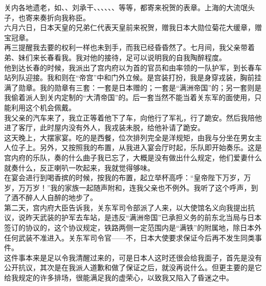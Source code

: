 关内各地遗老，如、、刘承干、、、、、、等等，都寄来祝贺的表章。上海的大流氓头子，也寄来奏折向我称臣。\\

六月六日，日本天皇的兄弟仁代表天皇前来祝贺，赠我日本大勋位菊花大缓章，赠宝冠章。\\

再三提醒我去要的权利一样也未到手，而我已经昏昏然了。七月间，我父亲带着弟、妹们来长春看我。我对他的接待，足可以说明我的自我陶醉程度。\\

他到达长春的时候，我派出了宫内府以为首的官员和由率领的一队护军，到长春车站列队迎接。我和则在“帝宫”中和门外立候。是宫装打扮，我是身穿戎装，胸前挂满了勋章。我的勋章有三套：一套是日本赠的；一套是“满洲帝国”的；另一套则是我偷着派人到关内定制的“大清帝国”的。后一套当然不能当着关东军的面使用，只能利用这个机会佩戴。\\

我父亲的汽车来了，我立正等着他下了车，向他行了军礼，行了跪安。然后我陪他进了客厅，此时屋内没有外人，我戎装未脱，给他补请了跪安。\\

这天晚上，大摆家宴。吃的是西餐，位次排列完全是洋规矩，由我与分坐在男女主人位子上。另外，又按照我的布置，从我进入宴会厅时起，乐队即开始奏乐。这是宫内府的乐队，奏的什么曲子我已忘了，大概是没有做出什么规定，他们爱妻什么就奏什么，反正喇叭一吹起来，我就觉得够味。\\

在宴会进行到喝香摈的时候，按我的布置，起立举杯高呼：“皇帝陛下万岁，万岁，万万岁！”我的家族一起随声附和，连我父亲也不例外。我听了这个呼声，到了酒不醉人人自醉的地步了。\\

第二天，宫内府大臣告诉我，关东军司令部派了人来，以大使馆名义向我提出抗议，说昨天武装的护军去车站，是违反“满洲帝国”已承担义务的前东北当局与日本签订的协议的，这个协议规定，铁路两侧一定范围内是“满铁”的附属地，除日本外任何武装不准进入。关东军司令官——不，日本大使要求保证今后再不发生同类事件。\\

这件事本来是足以令我清醒过来的，可是日本人这时还很会给我面子，首先是没有公开抗议，其次是在我派人道歉和做了保证之后，就没再说什么。但更主要的是它给我规定的许多排场，很能满足我的虚荣心，以致我又陷入了昏迷之中。\\

